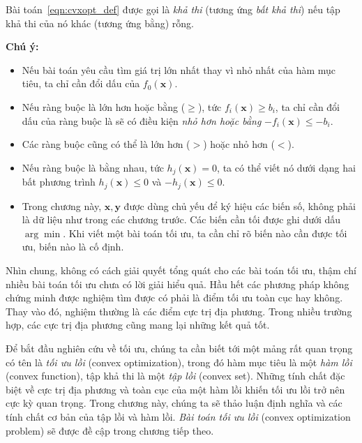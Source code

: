 Bài toán~\eqref{eqn:cvxopt_def} được gọi là \textit{khả thi} (tương ứng \textit{bất khả thi}) nếu tập khả thi của nó khác (tương ứng bằng) rỗng. 


\textbf{Chú ý:} 
 \begin{itemize}
    \item Nếu bài toán yêu cầu tìm giá trị lớn nhất thay vì nhỏ nhất của hàm mục
    tiêu, ta chỉ cần đổi dấu của $f_0(\mathbf{x})$.
 
    \item Nếu ràng buộc là {lớn hơn hoặc bằng} ($\geq$), tức $f_i(\mathbf{x}) \geq b_i$, ta chỉ cần đổi dấu của ràng buộc là sẽ có điều kiện \textit{nhỏ hơn hoặc bằng} $-f_i(\mathbf{x}) \leq -b_i$. 
 
    \item Các ràng buộc cũng có thể là {lớn hơn} ($>$) hoặc {nhỏ hơn} ($<$). 
     
    \item Nếu ràng buộc là {bằng nhau}, tức $h_j(\mathbf{x}) = 0$, ta có thể viết nó dưới dạng hai bất phương trình $h_j(\mathbf{x}) \leq 0$ và $-h_j(\mathbf{x}) \leq 0$. 
     
    \item Trong chương này, $\mathbf{x}, \mathbf{y}$ được dùng chủ yếu để ký
    hiệu các biến số, không phải là dữ liệu như trong các chương trước. Các biến cần
    tối được ghi dưới dấu $\arg \min$. Khi viết một bài toán
    tối ưu, ta cần chỉ rõ biến nào cần được tối ưu, biến nào là cố định.
 
\end{itemize}
Nhìn chung, không có cách giải quyết tổng quát cho các bài toán tối ưu, thậm chí
nhiều bài toán tối ưu chưa có lời giải hiểu quả. Hầu hết các phương pháp không
chứng minh được nghiệm tìm được có phải là điểm tối ưu toàn cục hay không. Thay vào đó,
nghiệm thường là các điểm cực trị địa phương. Trong nhiều
trường hợp, các cực trị địa phương cũng mang lại những kết quả tốt.
 
Để bắt đầu nghiên cứu về tối ưu, chúng ta cần biết tới một mảng rất quan trọng có tên là \textit{tối ưu lồi} ({convex optimization}), trong đó
{hàm mục tiêu} là một \textit{hàm lồi} ({convex function}), tập khả thi là một \textit{tập lồi} (convex set). Những tính chất đặc
biệt về cực trị địa phương và toàn cục của một {hàm
lồi} khiến tối ưu lồi trở nên cực kỳ quan trọng. Trong chương này, chúng ta sẽ
thảo luận định nghĩa và các tính chất cơ bản của {tập lồi} và {hàm
lồi}. \textit{Bài toán tối ưu lồi} ({convex optimization problem}) sẽ
được đề cập trong chương tiếp theo.

